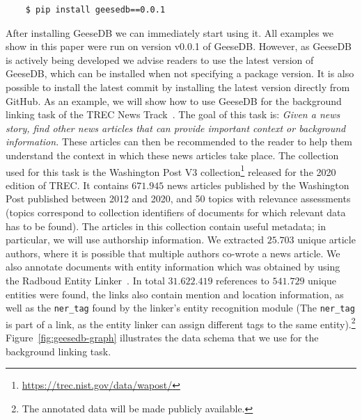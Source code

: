 \begin{verbatim}
	$ pip install geesedb==0.0.1
\end{verbatim}
After installing GeeseDB we can immediately start using it. All examples we show in this paper were run on version v0.0.1 of GeeseDB. However, as GeeseDB is actively being developed we advise readers to use the latest version of GeeseDB, which can be installed when not specifying a package version. It is also possible to install the latest commit by installing the latest version directly from GitHub.
As an example, we will show how to use GeeseDB for the background linking task of the TREC News Track~\cite{soboroff2018trec}. The goal of this task is: \textit{Given a news story, find other news articles that can provide important context or background information.} These articles can then be recommended to the reader to help them understand the context in which these news articles take place. The collection used for this task is the Washington Post V3 collection\footnote{\url{https://trec.nist.gov/data/wapost/}} released for the 2020 edition of TREC. It contains $671.945$ news articles published by the Washington Post published between 2012 and 2020, and 50 topics with relevance assessments (topics correspond to collection identifiers of documents for which relevant data has to be found). The articles in this collection contain useful metadata; in particular, we will use authorship information. We extracted $25.703$ unique article authors, where it is possible that multiple authors co-wrote a news article. We also annotate documents with entity information which was obtained by using the Radboud Entity Linker~\cite{van2020rel}. In total $31.622.419$ references to $541.729$ unique entities were found, the links also contain mention and location information, as well as the \texttt{ner\_tag} found by the linker's entity recognition module (The \texttt{ner\_tag} is part of a link, as the entity linker can assign different tags to the same entity).\footnote{The annotated data will be made publicly available.} Figure~\ref{fig:geesedb-graph} illustrates the data schema that we use for the background linking task. 

